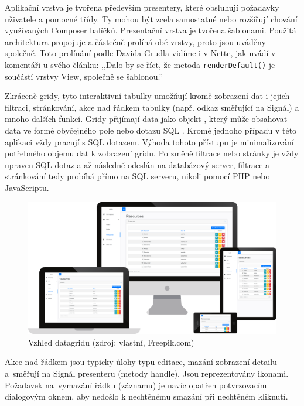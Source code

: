 Aplikační vrstva je tvořena především presentery, které obsluhují požadavky uživatele a pomocné třídy.  Ty mohou být zcela samostatné nebo rozšiřují chování využívaných Composer balíčků. Prezentační vrstva je tvořena šablonami. Použitá architektura propojuje a částečně prolíná obě vrstvy, proto jsou uváděny společně. Toto prolínání podle Davida Grudla vidíme i v Nette, jak uvádí v komentáři u svého článku: ,,Dalo by se říct, že metoda \texttt{renderDefault()} je součástí vrstvy View, společně se šablonou.'' \cite{NetteRefactoring}






\clearpage
{}

 \label{section:Datagridy}
Zkráceně gridy, tyto interaktivní tabulky umožňují kromě zobrazení dat i jejich filtraci, stránkování, akce nad řádkem tabulky (např. odkaz směřující na Signál) a mnoho dalších funkcí. Gridy přijímají data jako objekt , který může obsahovat data ve formě obyčejného pole nebo dotazu SQL \cite{ContributteDataGrid}. Kromě jednoho případu v této aplikaci vždy pracují s SQL dotazem. Výhoda tohoto přístupu je minimalizování potřebného objemu dat k zobrazení gridu. Po změně filtrace nebo stránky je vždy upraven SQL dotaz a až následně odeslán na databázový server, filtrace a stránkování tedy probíhá přímo na SQL serveru, nikoli pomocí PHP nebo JavaScriptu.

\begin{figure}[h]
	\centering
	\includegraphics[width=\linewidth]{svg/mockup/datagrid.eps}
	\captionsetup{width=\linewidth}
	\caption[Vzhled datagridu]{Vzhled datagridu (zdroj: vlastní, Freepik.com)}
	\label{mockup:login}
\end{figure}

Akce nad řádkem jsou typicky úlohy typu editace, mazání zobrazení detailu a~směřují na Signál presenteru (metody handle). Jsou reprezentovány ikonami. Požadavek na~vymazání řádku (záznamu) je navíc opatřen potvrzovacím dialogovým oknem, aby nedošlo k nechtěnému smazání při nechtěném kliknutí.
